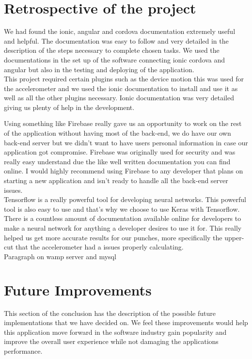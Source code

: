 \documentclass[a4paper,12pt]{report}
\begin{document}
\section{Retrospective of the project}

We had found the ionic, angular and cordova documentation extremely useful and helpful. 
The documentation was easy to follow and very detailed in the description of the steps necessary to complete chosen tasks.
We used the documentations in the set up of the software connecting ionic cordova and angular but also in the testing and deploying of the application.\\

This project required certain plugins such as the device motion this was used for the accelerometer and we used the ionic documentation to install and use it as well as all the other plugins necessary.
Ionic documentation was very detailed giving us plenty of help in the development.

Using something like Firebase really gave us an opportunity to work on the rest of the application without having most of the back-end, we do have our own back-end server but we didn't want to have users personal information in case our application got compromise. Firebase was originally used for security and was really easy understand due the like well written documentation you can find online. I would highly recommend using Firebase to any developer that plans on starting a new application and isn't ready to handle all the back-end server issues. \\

Tensorflow is a really powerful tool for developing neural networks. This powerful tool is also easy to use and that's why we choose to use Keras with Tensorflow. There is a countless amount of documentation available online for developers to make a neural network for anything a developer desires to use it for. This really helped us get more accurate results for our punches, more specifically the upper-cut that the accelerometer had a issues properly calculating.\\

Paragraph on wamp server and mysql

\section{Future Improvements}
This section of the conclusion has the description of the possible future implementations that we have decided on. We feel these improvements would help this application move forward in the software industry gain popularity and improve the overall user experience while not damaging the applications performance.\\
\end{document}
